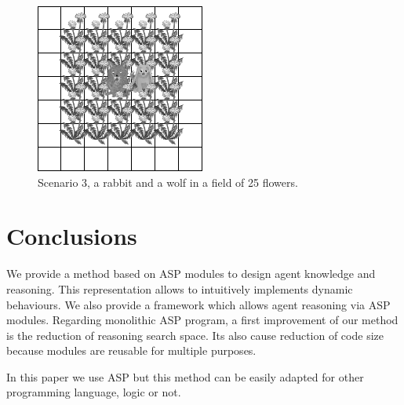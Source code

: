 \documentclass{aamas2012}
\begin{document}
	\begin{figure}
		\centering
		\includegraphics[keepaspectratio=true, scale=0.5]{scenario_3.png}
		\caption
		{
			\label{scenario_3}
			Scenario 3, a rabbit and a wolf in a field of 25 flowers.
		}
	\end{figure}

\section{Conclusions}

	We provide a method based on ASP modules to design agent knowledge and reasoning.
	This representation allows to intuitively implements dynamic behaviours.
	We also provide a framework which allows agent reasoning via ASP modules.
	Regarding monolithic ASP program, a first improvement of our method is the reduction of reasoning search space.
	Its also cause reduction of code size because modules are reusable for multiple purposes.
	
	In this paper we use ASP but this method can be easily adapted for other programming language, logic or not.
	
%

%
%

\nocite{*}
\end{document}
